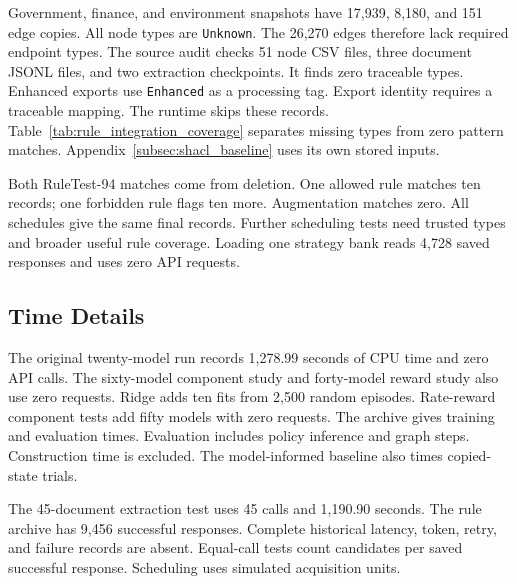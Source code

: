 Government, finance, and environment snapshots have 17,939, 8,180,
and 151 edge copies. All node types are \texttt{Unknown}.
The 26,270 edges therefore lack required endpoint types. The source audit
checks 51 node CSV files, three document JSONL files, and two extraction
checkpoints. It finds zero traceable types. Enhanced exports use
\texttt{Enhanced} as a processing tag. Export identity requires a
traceable mapping. The runtime skips these records.
Table~\ref{tab:rule_integration_coverage} separates missing types from
zero pattern matches. Appendix~\ref{subsec:shacl_baseline} uses its own
stored inputs.

Both RuleTest-94 matches come from deletion. One allowed rule matches
ten records; one forbidden rule flags ten more. Augmentation matches zero.
All schedules give the same final records. Further scheduling tests
need trusted types and broader useful rule coverage.
Loading one strategy bank reads 4,728 saved responses and uses
zero API requests.

\subsection{Time Details}

\label{app:runtime_details}

The original twenty-model run records 1,278.99 seconds of CPU time and
zero API calls. The sixty-model component study and forty-model reward
study also use zero requests. Ridge adds ten fits from 2,500 random
episodes. Rate-reward component tests add fifty models with zero requests.
The archive gives training and evaluation times. Evaluation includes
policy inference and graph steps. Construction time is excluded.
The model-informed baseline also times copied-state trials.

The 45-document extraction test uses 45 calls and 1,190.90 seconds.
The rule archive has 9,456 successful responses. Complete historical
latency, token, retry, and failure records are absent.
Equal-call tests count candidates per saved successful response.
Scheduling uses simulated acquisition units.
